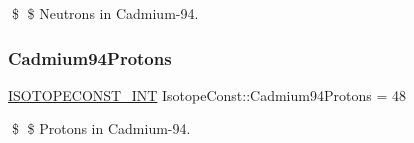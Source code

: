 \$ \$ Neutrons in Cadmium-\/94. \mbox{\label{group___isotope_const-_cadmium-_cd94_ga41aba07faf82f8909917ba55550731c6}} 
\subsubsection{\texorpdfstring{Cadmium94\+Protons}{Cadmium94Protons}}
{\footnotesize\ttfamily \mbox{\hyperlink{group___isotope_const-_macros_ga5f18360b3e99483a35c32d789e62621c}{I\+S\+O\+T\+O\+P\+E\+C\+O\+N\+S\+T\+\_\+\+I\+NT}} Isotope\+Const\+::\+Cadmium94\+Protons = 48}

\$ \$ Protons in Cadmium-\/94. 